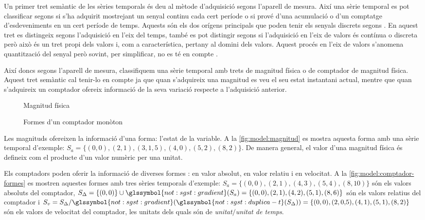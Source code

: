 Un primer tret semàntic de les sèries temporals és deu al mètode
d'adquisició segons l'aparell de mesura. Així una sèrie temporal es
pot classificar segons si s'ha adquirit mostrejant un senyal continu
cada cert període o si prové d'una acumulació o d'un comptatge
d'esdeveniments en un cert període de temps. Aquests són els dos
orígens principals que poden tenir els senyals discrets segons
\textcite[cap.~1]{proakismanolakis96}.  En aquest tret es distingeix
segons l'adquisició en l'eix del temps, també es pot distingir segons
si l'adquisició en l'eix de valors és contínua o discreta però això és
un tret propi dels valors i, com a característica, pertany al domini
dels valors. Aquest procés en l'eix de valors s'anomena quantització
del senyal però sovint, per simplificar, no es té en
compte \parencite{proakismanolakis96}.%



Així doncs segons l'aparell de mesura, classifiquem una sèrie
temporal amb trets de magnitud física o de comptador de magnitud
física. Aquest tret semàntic cal tenir-lo en compte ja que quan
s'adquireix una magnitud es veu el seu estat instantani actual, mentre
que quan s'adquireix un comptador ofereix informació de la seva
variació respecte a l'adquisició anterior.



\begin{figure}[tp]
  \centering
  
  \caption{Magnitud física}
  \label{fig:model:magnitud}
\end{figure}

\begin{figure}[tp]
  \centering
  
  \caption{Formes d'un comptador monòton}
  \label{fig:model:comptador-formes}
\end{figure}



Les magnituds ofereixen la informació d'una forma: l'estat de la
variable. A la \autoref{fig:model:magnitud} es mostra aquesta forma
amb una sèrie temporal d'exemple: $S_a = \{(0,0),(2,1),(3,
1{,}5),(4,0),(5,2),(8,2)\}$. De manera general, el valor d’una
magnitud física és defineix com el producte d’un valor numèric per una
unitat.


Els comptadors poden oferir la informació de diverses formes : en
valor absolut, en valor relatiu i en velocitat. A la
\autoref{fig:model:comptador-formes} es mostren aquestes formes amb
tres sèries temporals d'exemple: $S_a =
\{(0,0),(2,1),(4,3),(5,4),(8,10)\}$ són els valors absoluts del
comptador, $S_\Delta = \{(0,0)\} \cup
\glssymbol{not:sgst:gradient}(S_a) =
\{(0,0),(2,1),(4,2),(5,1),(8,6)\}$ són els valors relatius del
comptador i $S_v = S_\Delta /
\glssymbol{not:sgst:gradient}(\glssymbol{not:sgst:duplica-t}(S_\Delta))
= \{(0,0),(2,0{,}5),(4,1),(5,1),(8,2)\}$ són els valors de velocitat
del comptador, les unitats dels quals són de \emph{unitat$/$unitat de
  temps}.


